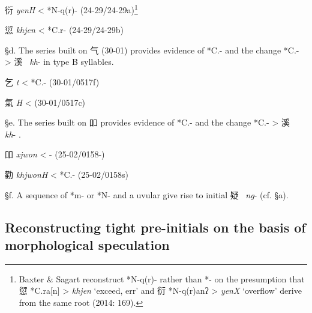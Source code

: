 \begin{description} \item
衍  \emph{yenH} \textless{} *N-q(r)- (24-29/24-29a)\footnote{Baxter \&
  Sagart reconstruct *N-q(r)- rather than *{}- on the presumption that 愆
  *C.{}ra[n] \textgreater{}  \emph{khjen} `exceed, err' and 衍
  *N-q(r)anʔ \textgreater{}  \emph{yenX} `overflow' derive from the same
  root (2014: 169).}

\item
愆 \emph{khjen} \textless{} *C.{}r- (24-29/24-29b)
\end{description}

§d. The series built on 气 (30-01) provides evidence of *C.{}- and the
change *C.{}- \textgreater{} 溪~ \emph{kh}- in type B syllables.

\begin{description} \item
乞 \emph{{}t} \textless{} *C.{}- (30-01/0517f)
\item
氣 \emph{{}H} \textless{} {} (30-01/0517c)
\end{description}

§e. The series built on 吅 provides evidence of *C.{}- and the change
*C.{}- \textgreater{} 溪~ \emph{kh}- 
\citep[170]{Baxter2014OldChinese}.

\begin{description} \item
吅 \emph{xjwon} \textless{} {}- (25-02/0158-)
\item
勸 \emph{khjwonH} \textless{} *C.{}- (25-02/0158s)
\end{description}

§f. A sequence of *m- or *N- and a uvular give rise to initial
疑~ \emph{ng}- (cf. §a).

\subsection{Reconstructing tight pre-initials on the basis of
morphological
speculation}


